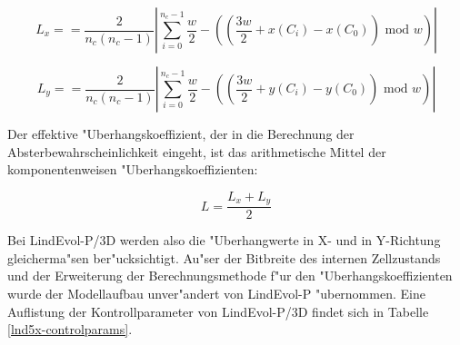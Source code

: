 \begin{displaymath}
L_x = = \frac{2}{n_c(n_c - 1)} \left| \sum_{i=0}^{n_c-1} \frac{w}{2} - ((\frac{3w}{2} + x(C_i) - x(C_0)) \mbox{ mod } w) \right|
\end{displaymath}

\begin{displaymath}
L_y = = \frac{2}{n_c(n_c - 1)} \left| \sum_{i=0}^{n_c-1} \frac{w}{2} - ((\frac{3w}{2} + y(C_i) - y(C_0)) \mbox{ mod } w) \right|
\end{displaymath}

Der effektive "Uberhangskoeffizient, der in die Berechnung der Absterbewahrscheinlichkeit
eingeht, ist das arithmetische Mittel der komponentenweisen "Uberhangskoeffizienten:

\begin{equation}
\label{leanover3d-eq}
L = \frac{L_x + L_y}{2}
\end{equation}

Bei LindEvol-P/3D werden also die "Uberhangwerte in X- und in Y-Richtung
gleicherma"sen ber"ucksichtigt. Au"ser der Bitbreite des internen Zellzustands und der
Erweiterung der Berechnungsmethode f"ur den "Uberhangskoeffizienten wurde der
Modellaufbau unver"andert von LindEvol-P "ubernommen. Eine Auflistung der Kontrollparameter
von LindEvol-P/3D findet sich in Tabelle \ref{lnd5x-controlparams}.



